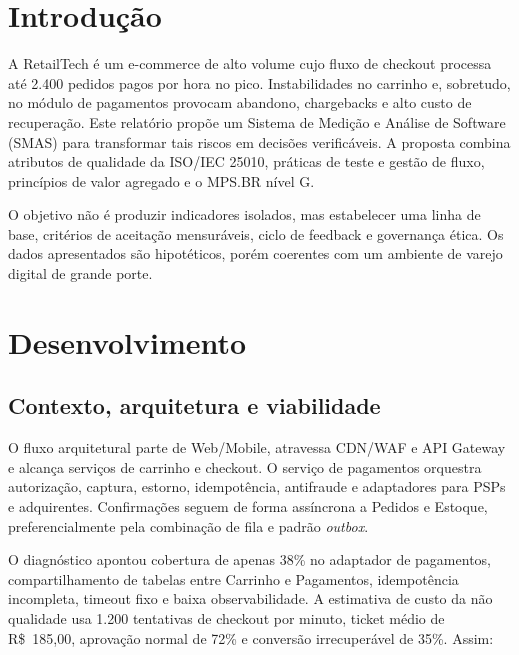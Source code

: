 \documentclass[12pt,openright,oneside,a4paper,brazil]{abntex2}
\begin{document}
\frenchspacing

\imprimircapa
\imprimirfolhaderosto*

\tableofcontents*
\cleardoublepage

\chapter{Introdução}

A RetailTech é um e-commerce de alto volume cujo fluxo de checkout processa até 2.400 pedidos pagos por hora no pico. Instabilidades no carrinho e, sobretudo, no módulo de pagamentos provocam abandono, chargebacks e alto custo de recuperação. Este relatório propõe um Sistema de Medição e Análise de Software (SMAS) para transformar tais riscos em decisões verificáveis. A proposta combina atributos de qualidade da ISO/IEC 25010, práticas de teste e gestão de fluxo, princípios de valor agregado e o MPS.BR nível G.

O objetivo não é produzir indicadores isolados, mas estabelecer uma linha de base, critérios de aceitação mensuráveis, ciclo de feedback e governança ética. Os dados apresentados são hipotéticos, porém coerentes com um ambiente de varejo digital de grande porte.

\chapter{Desenvolvimento}

\section{Contexto, arquitetura e viabilidade}

O fluxo arquitetural parte de Web/Mobile, atravessa CDN/WAF e API Gateway e alcança serviços de carrinho e checkout. O serviço de pagamentos orquestra autorização, captura, estorno, idempotência, antifraude e adaptadores para PSPs e adquirentes. Confirmações seguem de forma assíncrona a Pedidos e Estoque, preferencialmente pela combinação de fila e padrão \textit{outbox}.

O diagnóstico apontou cobertura de apenas 38\% no adaptador de pagamentos, compartilhamento de tabelas entre Carrinho e Pagamentos, idempotência incompleta, timeout fixo e baixa observabilidade. A estimativa de custo da não qualidade usa 1.200 tentativas de checkout por minuto, ticket médio de R\$~185,00, aprovação normal de 72\% e conversão irrecuperável de 35\%. Assim:
\end{document}
